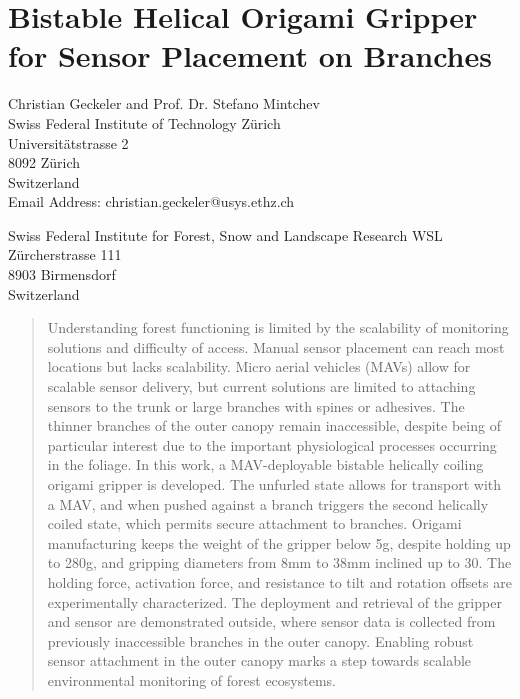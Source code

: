 \chapter[Bistable Helical Origami Gripper for Sensor Placement]{Bistable Helical Origami Gripper for Sensor Placement on Branches}
\label{ch:OG}

\author{Christian Geckeler*}
\author{Stefano Mintchev}

\begin{affiliations}
\noindent
Christian Geckeler and Prof. Dr. Stefano Mintchev\\
Swiss Federal Institute of Technology Zürich\\
Universitätstrasse 2\\
8092 Zürich\\
Switzerland\\
Email Address: christian.geckeler@usys.ethz.ch\\ %
\par

\noindent
Swiss Federal Institute for Forest, Snow and Landscape Research WSL\\
Zürcherstrasse 111\\
8903 Birmensdorf\\
Switzerland
\end{affiliations}


\begin{abstract} %
Understanding forest functioning is limited by the scalability of monitoring solutions and difficulty of access. Manual sensor placement can reach most locations but lacks scalability. Micro aerial vehicles (MAVs) allow for scalable sensor delivery, but current solutions are limited to attaching sensors to the trunk or large branches with spines or adhesives. The thinner branches of the outer canopy remain inaccessible, despite being of particular interest due to the important physiological processes occurring in the foliage. In this work, a MAV-deployable bistable helically coiling origami gripper is developed. The unfurled state allows for transport with a MAV, and when pushed against a branch triggers the second helically coiled state, which permits secure attachment to branches. Origami manufacturing keeps the weight of the gripper below 5g, despite holding up to 280g, and gripping diameters from 8mm to 38mm inclined up to 30\degree. The holding force, activation force, and resistance to tilt and rotation offsets are experimentally characterized. The deployment and retrieval of the gripper and sensor are demonstrated outside, where sensor data is collected from previously inaccessible branches in the outer canopy. Enabling robust sensor attachment in the outer canopy marks a step towards scalable environmental monitoring of forest ecosystems.
\end{abstract}


